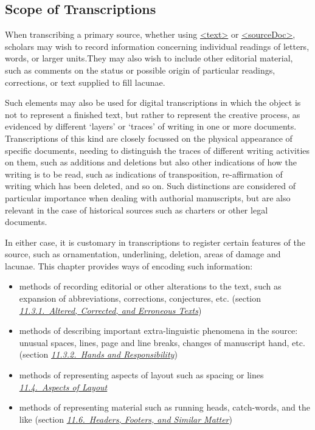 \subsection[{Scope of Transcriptions}]{Scope of Transcriptions}\label{PHST}\par
When transcribing a primary source, whether using \hyperref[TEI.text]{<text>} or \hyperref[TEI.sourceDoc]{<sourceDoc>}, scholars may wish to record information concerning individual readings of letters, words, or larger units.They may also wish to include other editorial material, such as comments on the status or possible origin of particular readings, corrections, or text supplied to fill lacunae.\par
Such elements may also be used for digital transcriptions in which the object is not to represent a finished text, but rather to represent the creative process, as evidenced by different ‘layers’ or ‘traces’ of writing in one or more documents. Transcriptions of this kind are closely focussed on the physical appearance of specific documents, needing to distinguish the traces of different writing activities on them, such as additions and deletions but also other indications of how the writing is to be read, such as indications of transposition, re-affirmation of writing which has been deleted, and so on. Such distinctions are considered of particular importance when dealing with authorial manuscripts, but are also relevant in the case of historical sources such as charters or other legal documents.\par
In either case, it is customary in transcriptions to register certain features of the source, such as ornamentation, underlining, deletion, areas of damage and lacunae. This chapter provides ways of encoding such information: \begin{itemize}
\item methods of recording editorial or other alterations to the text, such as expansion of abbreviations, corrections, conjectures, etc. (section \textit{\hyperref[PHCH]{11.3.1.\ Altered, Corrected, and Erroneous Texts}})
\item methods of describing important extra-linguistic phenomena in the source: unusual spaces, lines, page and line breaks, changes of manuscript hand, etc. (section \textit{\hyperref[PHPH]{11.3.2.\ Hands and Responsibility}})
\item methods of representing aspects of layout such as spacing or lines \textit{\hyperref[PHLAY]{11.4.\ Aspects of Layout}}
\item methods of representing material such as running heads, catch-words, and the like (section \textit{\hyperref[PHSK]{11.6.\ Headers, Footers, and Similar Matter}})
\end{itemize} \par
